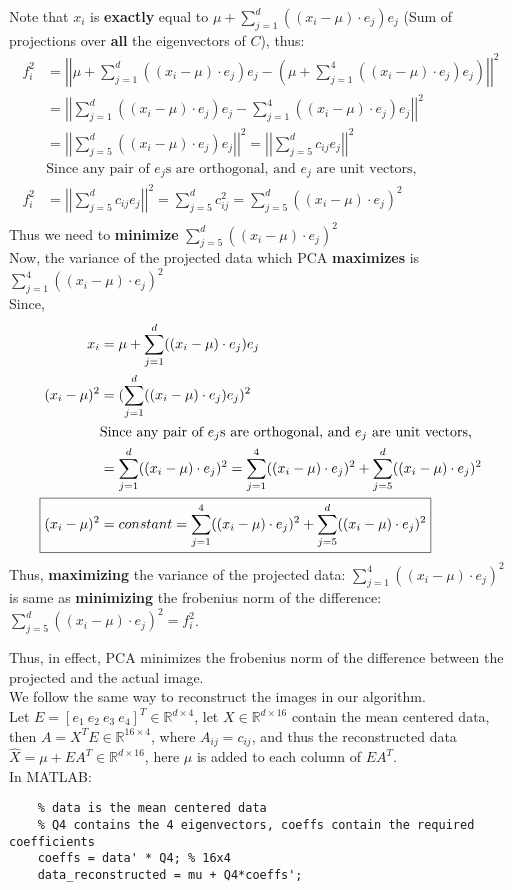 \documentclass[11pt, fleqn]{article}
\begin{document}
Note that $x_i$ is \textbf{exactly} equal to $ \mu + \sum_{j=1}^{d}((x_i - \mu)\cdot e_j)e_j $ (Sum of projections over \textbf{all} the eigenvectors of $C$), thus:
$$
\begin{aligned}
    f_i^2 &= \left|\left|\mu + \sum_{j=1}^{d}((x_i - \mu)\cdot e_j)e_j - (\mu + \sum_{j=1}^{4}((x_i - \mu)\cdot e_j)e_j)\right|\right|^2 \\
    &= \left|\left|\sum_{j=1}^{d}((x_i - \mu)\cdot e_j)e_j - \sum_{j=1}^{4}((x_i - \mu)\cdot e_j)e_j\right|\right|^2\\
    &= \left|\left|\sum_{j=5}^{d}((x_i - \mu)\cdot e_j)e_j\right|\right|^2 = \left|\left|\sum_{j=5}^{d}c_{ij}e_j\right|\right|^2\\
    &\text{Since any pair of $e_j$s are orthogonal, and $e_j$ are unit vectors,}\\
    f_i^2 &= \left|\left|\sum_{j=5}^{d}c_{ij}e_j\right|\right|^2 = \sum_{j=5}^{d}c_{ij}^2 = \sum_{j=5}^{d}((x_i - \mu)\cdot e_j)^2\\ 
\end{aligned}
$$
Thus we need to \textbf{minimize} $ \sum_{j=5}^{d}((x_i - \mu)\cdot e_j)^2$\\
Now, the variance of the projected data which PCA \textbf{maximizes} is $\sum_{j=1}^{4}((x_i - \mu)\cdot e_j)^2$\\
Since, 
$$ 
\begin{aligned}
    x_i &= \mu + \sum_{j=1}^{d}((x_i - \mu)\cdot e_j)e_j\\ 
    (x_i - \mu)^2 &= (\sum_{j=1}^{d}((x_i - \mu)\cdot e_j)e_j)^2 \\
    &\text{Since any pair of $e_j$s are orthogonal, and $e_j$ are unit vectors,}\\
    &= \sum_{j=1}^{d}((x_i - \mu)\cdot e_j)^2 = \sum_{j=1}^{4}((x_i - \mu)\cdot e_j)^2 + \sum_{j=5}^{d}((x_i - \mu)\cdot e_j)^2\\
    \Aboxed{(x_i - \mu)^2 &= constant =  \sum_{j=1}^{4}((x_i - \mu)\cdot e_j)^2 + \sum_{j=5}^{d}((x_i - \mu)\cdot e_j)^2} 
\end{aligned}
$$
Thus, \textbf{maximizing} the variance of the projected data: $\sum_{j=1}^{4}((x_i - \mu)\cdot e_j)^2$ is same as \textbf{minimizing} the frobenius norm of the difference: $\sum_{j=5}^{d}((x_i - \mu)\cdot e_j)^2 = f_i^2 $.
 
\medskip
Thus, in effect, PCA minimizes the frobenius norm of the difference between the projected and the actual image.\\
We follow the same way to reconstruct the images in our algorithm.\\
Let $E = [e_1\  e_2\  e_3 \ e_4]^T \in \mathbb{R}^{d \times 4} $, let $X \in \mathbb{R}^{d \times 16}$ contain the mean centered data, then $A = X^TE \in \mathbb{R}^{16 \times 4}$, where $A_{ij} = c_{ij}$, and thus the reconstructed data $\hat X = \mu + EA^T \in \mathbb{R}^{d \times 16}$, here $\mu$ is added to each column of $EA^T$.\\
In MATLAB:
\begin{verbatim}
    % data is the mean centered data 
    % Q4 contains the 4 eigenvectors, coeffs contain the required coefficients 
    coeffs = data' * Q4; % 16x4
    data_reconstructed = mu + Q4*coeffs';
\end{verbatim}
\end{document}

